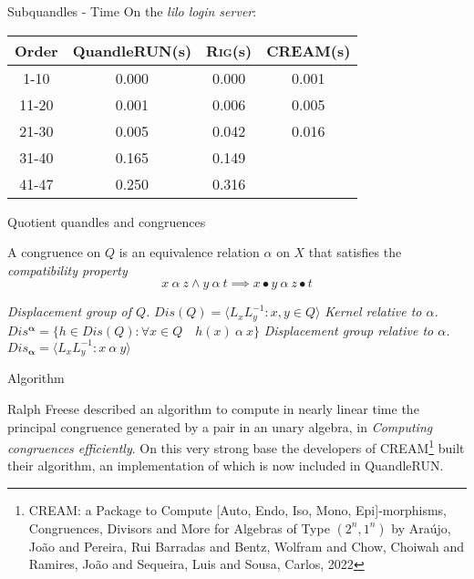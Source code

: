 \begin{frame}{Subquandles - Time}
On the \emph{lilo login server}: \newline
    \begin{center}
    \begin{tabular}{|c|c|c|c|}
        \hline
         Order & \textsf{QuandleRUN}(s) & \textsc{Rig}(s) & \textsc{CREAM}(s) \\ \hline
         1-10 & 0.000 & 0.000 & 0.001 \\ \hline
         11-20 & 0.001 & 0.006 & 0.005 \\ \hline
         21-30 & 0.005 & 0.042 & 0.016 \\ \hline
         31-40 & 0.165 & 0.149 &   \\ \hline
         41-47 & 0.250& 0.316&    \\ \hline
    \end{tabular}
    
\end{center}
\end{frame}


\begin{frame}{Quotient quandles and congruences}
\small
\begin{definition}[Congruence]
A congruence on $Q$ is an equivalence relation $\alpha$ on $X$ that satisfies the \emph{compatibility property}
\[ x ~\alpha~ z \land y~\alpha~t \implies x \bullet y ~\alpha~ z \bullet t  \]
\end{definition}
\begin{definition}
\textit{Displacement group of $Q$.}\newline
$Dis(Q) = \langle L_xL_y^{-1} :  x,y \in Q \rangle$\newline\newline
\textit{Kernel relative to $\alpha$.}\newline
$Dis^{\mathbf{\alpha}} = \{ h \in Dis(Q) : \forall x \in Q \quad h(x)~\alpha~x  \}$\newline\newline
\textit{Displacement group relative to $\alpha$.}\newline
$Dis_{\mathbf{\alpha}} = \langle L_xL_y^{-1} :  x~\alpha~y\rangle$
\end{definition}
\end{frame}



\begin{frame}{Algorithm}
    
Ralph Freese described an algorithm to compute in nearly linear time the principal congruence generated by a pair in an unary algebra, in \textit{Computing congruences efficiently}. On this very strong base the developers of CREAM\footnote{CREAM: a Package to Compute [Auto, Endo, Iso, Mono, Epi]-morphisms, Congruences, Divisors and More for Algebras of Type $(2^n, 1^n)$ by Ara{\'u}jo, Jo{\~a}o and Pereira, Rui Barradas and Bentz, Wolfram and Chow, Choiwah and Ramires, Jo{\~a}o and Sequeira, Luis and Sousa, Carlos, 2022\newline} built their algorithm, an implementation of which is now included in QuandleRUN.

\end{frame}


